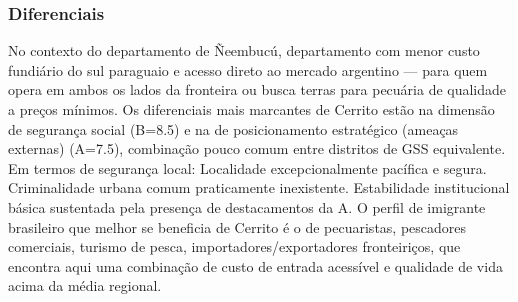 \subsubsection*{Diferenciais}\label{dif-cerrito-1203}
No contexto do departamento de Ñeembucú, departamento com menor custo fundiário do sul paraguaio e acesso direto ao mercado argentino — para quem opera em ambos os lados da fronteira ou busca terras para pecuária de qualidade a preços mínimos. Os diferenciais mais marcantes de Cerrito estão na dimensão de segurança social (B=8.5) e na de posicionamento estratégico (ameaças externas) (A=7.5), combinação pouco comum entre distritos de GSS equivalente. Em termos de segurança local: Localidade excepcionalmente pacífica e segura. Criminalidade urbana comum praticamente inexistente. Estabilidade institucional básica sustentada pela presença de destacamentos da A. O perfil de imigrante brasileiro que melhor se beneficia de Cerrito é o de pecuaristas, pescadores comerciais, turismo de pesca, importadores/exportadores fronteiriços, que encontra aqui uma combinação de custo de entrada acessível e qualidade de vida acima da média regional.
